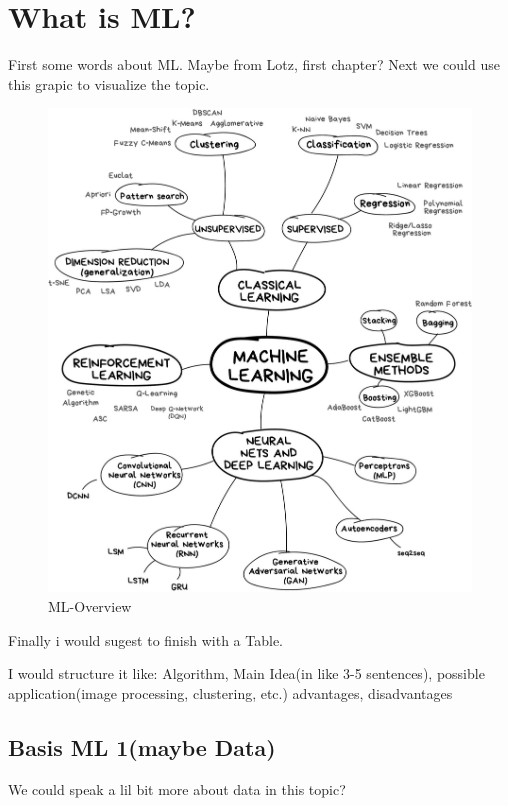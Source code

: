\documentclass[a4paper,titlepage]{article}
\numberwithin{equation}{section} %
\begin{document}
\section{What is ML?}
First some words about ML. Maybe from Lotz, first chapter?
Next we could use this grapic to visualize the topic.
\begin{figure}[hbtp]
	\centering
	\includegraphics[width=1\textwidth]{ML}
	\caption{ML-Overview}
	\label{fig:Datensatz - unbearbeitet}
\end{figure}

Finally i would sugest to finish with a Table.

I would structure it like:
Algorithm, Main Idea(in like 3-5 sentences), possible application(image processing, clustering, etc.) advantages, disadvantages


\subsection{Basis ML 1(maybe Data)}
We could speak a lil bit more about data in this topic?
\end{document}
